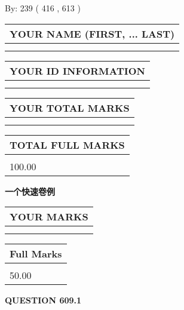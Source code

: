 \documentclass{ctexart}
\begin{document}
   
\hspace{1.0in} By: 
 239 ( 416 ,  613 )
   
   
   
   
\newpage 
\setcounter{page}{ 
   609001 } 
   
   
   
   
\noindent\begin{tabular}{|l|}
\hline
YOUR NAME (FIRST, ... LAST)  \\
\hline
 \\ 
 \\ 
\hline
\end{tabular}
\hspace{0.05in} \begin{tabular}{|l|}
\hline
 YOUR   ID   INFORMATION  \\
\hline
 \\ 
 \\ 
\hline
\end{tabular}
   
   
\vspace{0.2in}\noindent\begin{tabular}{|l|}
\hline
YOUR TOTAL MARKS  \\
\hline
 \\ 
 \\ 
\hline
\end{tabular}
\hspace{0.05in} \begin{tabular}{|l|}
\hline
TOTAL FULL MARKS  \\
\hline
 \\ 
100.00 \\
\hline
\end{tabular}
   
   
 \vspace{0.2in}
{\LARGE {\textbf{ 一个快速卷例}}}
   
   
  
\vspace{0.2in}
  
\noindent\begin{tabular}{|l|}
\hline
 YOUR MARKS  \\
\hline
 \\ 
 \\ 
\hline
\end{tabular}
\hspace{0.05in} \begin{tabular}{|l|}
\hline
 Full Marks  \\
\hline
 \\ 
50.00 \\
\hline
\end{tabular}
{\textbf{\Large{QUESTION
609.1 
}}}
  
\end{document}
